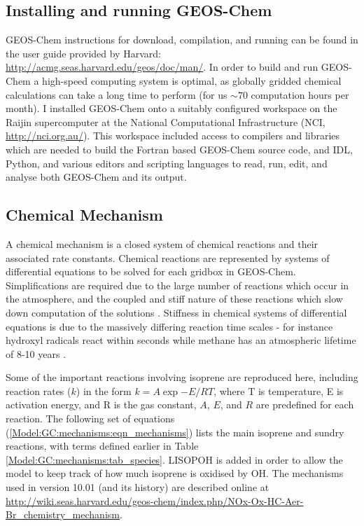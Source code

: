   
  \subsection{Installing and running GEOS-Chem}
    \label{Model:GC:running}
    GEOS-Chem instructions for download, compilation, and running can be found in the user guide provided by Harvard: \url{http://acmg.seas.harvard.edu/geos/doc/man/}.
    In order to build and run GEOS-Chem a high-speed computing system is optimal, as globally gridded chemical calculations can take a long time to perform (for us $\sim 70$ computation hours per month).
    I installed GEOS-Chem onto a suitably configured workspace on the Raijin supercomputer at the National Computational Infrastructure (NCI, \url{http://nci.org.au/}).
    This workspace included access to compilers and libraries which are needed to build the Fortran based GEOS-Chem source code, and IDL, Python, and various editors and scripting languages to read, run, edit, and analyse both GEOS-Chem and its output.
  
  \subsection{Chemical Mechanism}
    \label{Model:GC:mechanisms}
    A chemical mechanism is a closed system of chemical reactions and their associated rate constants.
    Chemical reactions are represented by systems of differential equations to be solved for each gridbox in GEOS-Chem.
    Simplifications are required due to the large number of reactions which occur in the atmosphere, and the coupled and stiff nature of these reactions which slow down computation of the solutions \parencite{BrasseurJacob2017}.
    Stiffness in chemical systems of differential equations is due to the massively differing reaction time scales - for instance hydroxyl radicals react within seconds while methane has an atmospheric lifetime of 8-10 years \parencite{Wuebbles2002}. 
    
    Some of the important reactions involving isoprene are reproduced here, including reaction rates ($k$) in the form $ k = A \exp{-E/RT}$, where T is temperature, E is activation energy, and R is the gas constant, $A$, $E$, and $R$ are predefined for each reaction.
    The following set of equations (\ref{Model:GC:mechanisms:eqn_mechanisms}) lists the main isoprene and sundry reactions, with terms defined earlier in Table \ref{Model:GC:mechanisms:tab_species}.
    LISOPOH is added in order to allow the model to keep track of how much isoprene is oxidised by OH.
    The mechanisms used in version 10.01 (and its history) are described online at \url{http://wiki.seas.harvard.edu/geos-chem/index.php/NOx-Ox-HC-Aer-Br_chemistry_mechanism}.
    

